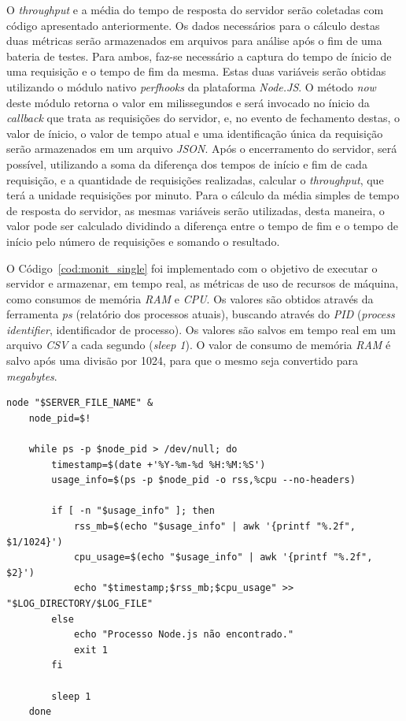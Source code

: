 \documentclass[12pt]{article}
\begin{document}
O \textit{throughput} e a média do tempo de resposta do servidor serão coletadas com código apresentado anteriormente.
Os dados necessários para o cálculo destas duas métricas serão armazenados em arquivos para análise após o fim de uma 
bateria de testes. Para ambos, faz-se necessário a captura do tempo de ínicio de uma requisição
e o tempo de fim da mesma. Estas duas variáveis serão obtidas utilizando
o módulo nativo \textit{perf\textunderscore hooks} da plataforma \textit{Node.JS}. 
O método \textit{now} deste módulo retorna o valor em milissegundos e será invocado no ínicio da 
\textit{callback} que trata as requisições do servidor, e, no evento de 
fechamento destas, o valor de ínicio, o valor de tempo atual e
uma identificação única da requisição serão armazenados em um arquivo \textit{JSON}. Após o encerramento do servidor, será 
possível, utilizando a soma da diferença dos tempos de início e fim de cada requisição, e a quantidade de requisições realizadas, calcular o 
\textit{throughput}, que terá a unidade requisições por minuto. Para o cálculo da média simples de tempo de resposta do servidor, 
as mesmas variáveis serão utilizadas, desta maneira, o valor pode ser calculado dividindo a diferença entre o tempo de fim e o 
tempo de início pelo número de requisições e somando o resultado.

O Código~\ref{cod:monit_single} foi implementado com o objetivo de executar o servidor e armazenar, em tempo real,
as métricas de uso de recursos de máquina, como consumos de memória \textit{RAM} e \textit{CPU}. Os valores 
são obtidos através da ferramenta \textit{ps} (relatório dos processos atuais), buscando através do 
\textit{PID} (\textit{process identifier}, identificador de processo). Os valores são salvos em tempo real em um arquivo 
\textit{CSV} a cada segundo (\textit{sleep 1}). O valor de consumo de memória \textit{RAM} é salvo após uma divisão por 1024, 
para que o mesmo seja convertido para \textit{megabytes}. 

\begin{lstlisting}[caption={\textit{Script} para monitrar processos \textit{single thread}}, label=cod:monit_single]
	node "$SERVER_FILE_NAME" &
	node_pid=$!

	while ps -p $node_pid > /dev/null; do
		timestamp=$(date +'%Y-%m-%d %H:%M:%S')
		usage_info=$(ps -p $node_pid -o rss,%cpu --no-headers)

		if [ -n "$usage_info" ]; then
			rss_mb=$(echo "$usage_info" | awk '{printf "%.2f", $1/1024}')
			cpu_usage=$(echo "$usage_info" | awk '{printf "%.2f", $2}')
			echo "$timestamp;$rss_mb;$cpu_usage" >> "$LOG_DIRECTORY/$LOG_FILE"
		else
			echo "Processo Node.js não encontrado."
			exit 1
		fi

		sleep 1
	done
\end{lstlisting}
\end{document}
